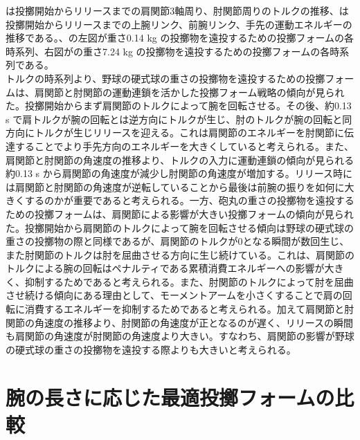 は投擲開始からリリースまでの肩関節3軸周り、肘関節周りのトルクの推移、は投擲開始からリリースまでの上腕リンク、前腕リンク、手先の運動エネルギーの推移である。、の左図が重さ0.14 kg の投擲物を遠投するための投擲フォームの各時系列、右図がの重さ7.24 kg の投擲物を遠投するための投擲フォームの各時系列である。\\
トルクの時系列より、野球の硬式球の重さの投擲物を遠投するための投擲フォームは、肩関節と肘関節の運動連鎖を活かした投擲フォーム戦略の傾向が見られた。投擲開始からまず肩関節のトルクによって腕を回転させる。その後、約0.13 s で肩トルクが腕の回転とは逆方向にトルクが生じ、肘のトルクが腕の回転と同方向にトルクが生じリリースを迎える。これは肩関節のエネルギーを肘関節に伝達することでより手先方向のエネルギーを大きくしていると考えられる。また、肩関節と肘関節の角速度の推移より、トルクの入力に運動連鎖の傾向が見られる約0.13 s から肩関節の角速度が減少し肘関節の角速度が増加する。リリース時には肩関節と肘関節の角速度が逆転していることから最後は前腕の振りを如何に大きくするのかが重要であると考えられる。一方、砲丸の重さの投擲物を遠投するための投擲フォームは、肩関節による影響が大きい投擲フォームの傾向が見られた。投擲開始から肩関節のトルクによって腕を回転させる傾向は野球の硬式球の重さの投擲物の際と同様であるが、肩関節のトルクが0となる瞬間が数回生じ、また肘関節のトルクは肘を屈曲させる方向に生じ続けている。これは、肩関節のトルクによる腕の回転はペナルティである累積消費エネルギーへの影響が大きく、抑制するためであると考えられる。また、肘関節のトルクによって肘を屈曲させ続ける傾向にある理由として、モーメントアームを小さくすることで肩の回転に消費するエネルギーを抑制するためであると考えられる。加えて肩関節と肘関節の角速度の推移より、肘関節の角速度が正となるのが遅く、リリースの瞬間も肩関節の角速度が肘関節の角速度より大きい。すなわち、肩関節の影響が野球の硬式球の重さの投擲物を遠投する際よりも大きいと考えられる。\\



\section{腕の長さに応じた最適投擲フォームの比較}
